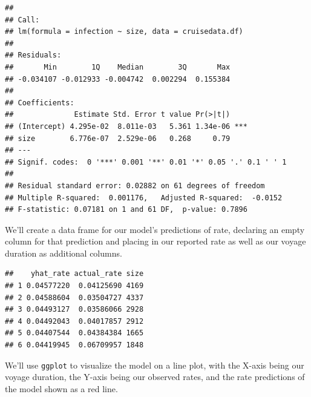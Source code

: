 \documentclass[
  11,
]{book}
\newenvironment{Shaded}{\begin{snugshade}}{\end{snugshade}}
\newcommand{\AttributeTok}[1]{\textcolor[rgb]{0.27,0.27,0.27}{#1}}
\newcommand{\ConstantTok}[1]{\textcolor[rgb]{0.37,0.37,0.37}{#1}}
\newcommand{\FunctionTok}[1]{\textcolor[rgb]{0.27,0.27,0.27}{\textbf{#1}}}
\newcommand{\NormalTok}[1]{#1}
\newcommand{\OtherTok}[1]{\textcolor[rgb]{0.37,0.37,0.37}{#1}}
\newcommand{\SpecialCharTok}[1]{\textcolor[rgb]{0.43,0.43,0.43}{\textbf{#1}}}
\begin{document}
\begin{verbatim}
## 
## Call:
## lm(formula = infection ~ size, data = cruisedata.df)
## 
## Residuals:
##       Min        1Q    Median        3Q       Max 
## -0.034107 -0.012933 -0.004742  0.002294  0.155384 
## 
## Coefficients:
##              Estimate Std. Error t value Pr(>|t|)    
## (Intercept) 4.295e-02  8.011e-03   5.361 1.34e-06 ***
## size        6.776e-07  2.529e-06   0.268     0.79    
## ---
## Signif. codes:  0 '***' 0.001 '**' 0.01 '*' 0.05 '.' 0.1 ' ' 1
## 
## Residual standard error: 0.02882 on 61 degrees of freedom
## Multiple R-squared:  0.001176,   Adjusted R-squared:  -0.0152 
## F-statistic: 0.07181 on 1 and 61 DF,  p-value: 0.7896
\end{verbatim}

We'll create a data frame for our model's predictions of rate, declaring an empty column for that prediction and placing in our reported rate as well as our voyage duration as additional columns.

\begin{Shaded}
\end{Shaded}

\begin{verbatim}
##    yhat_rate actual_rate size
## 1 0.04577220  0.04125690 4169
## 2 0.04588604  0.03504727 4337
## 3 0.04493127  0.03586066 2928
## 4 0.04492043  0.04017857 2912
## 5 0.04407544  0.04384384 1665
## 6 0.04419945  0.06709957 1848
\end{verbatim}

We'll use \texttt{ggplot} to visualize the model on a line plot, with the X-axis being our voyage duration, the Y-axis being our observed rates, and the rate predictions of the model shown as a red line.
\end{document}
